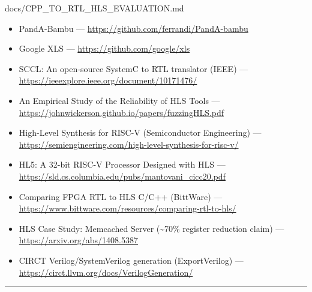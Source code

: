 \begin{relocated}{docs/CPP_TO_RTL_HLS_EVALUATION.md}
\begin{itemize}
\tightlist
\item
  PandA-Bambu ---
  \href{https://github.com/ferrandi/PandA-bambu}{https:/\allowbreak{}/\allowbreak{}github.com/\allowbreak{}ferrandi/\allowbreak{}PandA-bambu}
\item
  Google XLS ---
  \href{https://github.com/google/xls}{https:/\allowbreak{}/\allowbreak{}github.com/\allowbreak{}google/\allowbreak{}xls}
\item
  SCCL: An open-source SystemC to RTL translator (IEEE) ---
  \href{https://ieeexplore.ieee.org/document/10171476/}{https:/\allowbreak{}/\allowbreak{}ieeexplore.ieee.org/\allowbreak{}document/\allowbreak{}10171476/}
\item
  An Empirical Study of the Reliability of HLS Tools ---
  \href{https://johnwickerson.github.io/papers/fuzzingHLS.pdf}{https:/\allowbreak{}/\allowbreak{}johnwickerson.github.io/\allowbreak{}papers/\allowbreak{}fuzzingHLS.pdf}
\item
  High-Level Synthesis for RISC-V (Semiconductor Engineering) ---
  \href{https://semiengineering.com/high-level-synthesis-for-risc-v/}{https:/\allowbreak{}/\allowbreak{}semiengineering.com/\allowbreak{}high-level-synthesis-for-risc-v/}
\item
  HL5: A 32-bit RISC-V Processor Designed with HLS ---
  \href{https://sld.cs.columbia.edu/pubs/mantovani_cicc20.pdf}{https:/\allowbreak{}/\allowbreak{}sld.cs.columbia.edu/\allowbreak{}pubs/\allowbreak{}mantovani\_\allowbreak{}cicc20.pdf}
\item
  Comparing FPGA RTL to HLS C/C++ (BittWare) ---
  \href{https://www.bittware.com/resources/comparing-rtl-to-hls/}{https:/\allowbreak{}/\allowbreak{}www.bittware.com/\allowbreak{}resources/\allowbreak{}comparing-rtl-to-hls/}
\item
  HLS Case Study: Memcached Server (\textasciitilde70\% register
  reduction claim) ---
  \href{https://arxiv.org/abs/1408.5387}{https:/\allowbreak{}/\allowbreak{}arxiv.org/\allowbreak{}abs/\allowbreak{}1408.5387}
\item
  CIRCT Verilog/\allowbreak{}SystemVerilog generation (ExportVerilog)
  ---
  \href{https://circt.llvm.org/docs/VerilogGeneration/}{https:/\allowbreak{}/\allowbreak{}circt.llvm.org/\allowbreak{}docs/\allowbreak{}VerilogGeneration/}
\end{itemize}

\begin{center}\rule{0.5\linewidth}{0.5pt}\end{center}


\end{relocated}

